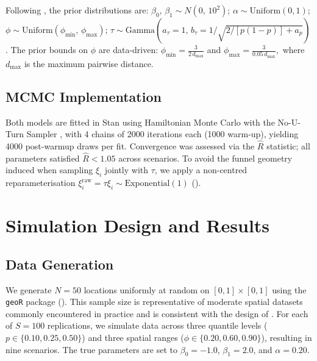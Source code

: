 \documentclass[twoside]{article}
\numberwithin{equation}{section}
\begin{document}
	Following \cite{LumGelfand2012}, the prior distributions are:
	$\beta_0,\, \beta_1 \sim N(0,\, 10^2)$;
	$\alpha            \sim \mathrm{Uniform}(0, 1)$;
	$\phi              \sim \mathrm{Uniform}(\phi_{\min},\, \phi_{\max})$;
	$\tau              \sim \mathrm{Gamma}(a_\tau = 1,\, b_\tau = 1/\sqrt{2/[p(1-p)] + a_p})$.
	The prior bounds on $\phi$ are data-driven: $\phi_{\min} = \frac{3}{2\,d_{\max}}$ and $\phi_{\max} = \frac{3}{0.05\,d_{\max}},$ where $d_{\max}$ is the maximum pairwise distance.
	
	\subsection{MCMC Implementation}
	
	Both models are fitted in Stan \citep{Stan2023} using Hamiltonian
	Monte Carlo with the No-U-Turn Sampler \citep{HoffmanGelman2014}, with
	4 chains of 2000 iterations each (1000 warm-up), yielding 4000
	post-warmup draws per fit. Convergence was assessed via the
	$\hat{R}$ statistic; all parameters satisfied
	$\hat{R} < 1.05$ across scenarios. To avoid the funnel geometry induced when sampling $\xi_i$ jointly with $\tau$,
	we apply a non-centred reparameterisation
	$\xi_i^{\mathrm{raw}} = \tau\xi_i \sim \mathrm{Exponential}(1)$
	(\cite{Betancourt2017}).
	
	\section{Simulation Design and Results}
	
	\subsection{Data Generation}
	
	We generate $N=50$ locations uniformly at random on $[0,1] \times [0,1]$ using the
	\texttt{geoR} package (\cite{geoR2001}). This sample size is
	representative of moderate spatial datasets commonly encountered in
	practice and is consistent with the design of \cite{LumGelfand2012}.
	 For each of $S=100$ replications, we
	simulate data across three quantile levels ($p \in \{0.10, 0.25, 0.50\}$) and
	three spatial ranges ($\phi \in \{0.20, 0.60, 0.90\}$),
	resulting in nine scenarios. The true parameters are set to $\beta_0 = -1.0$,
	$\beta_1 = 2.0$, and $\alpha = 0.20$.
	
\end{document}
